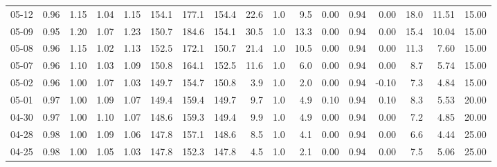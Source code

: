 \begin{threeparttable}
{\begin{tabular}{lrrrrrrrrrrrrrrrr}
  05-12 &         0.96 &           1.15 &          1.04 &          1.15 & 154.1 & 177.1 & 154.4 &       22.6 &                      1.0 &                 9.5 &       0.00 &      0.94 &           0.00 &             18.0 &           11.51 &                  15.00 \\
  05-09 &         0.95 &           1.20 &          1.07 &          1.23 & 150.7 & 184.6 & 154.1 &       30.5 &                      1.0 &                13.3 &       0.00 &      0.94 &           0.00 &             15.4 &           10.04 &                  15.00 \\
  05-08 &         0.96 &           1.15 &          1.02 &          1.13 & 152.5 & 172.1 & 150.7 &       21.4 &                      1.0 &                10.5 &       0.00 &      0.94 &           0.00 &             11.3 &            7.60 &                  15.00 \\
  05-07 &         0.96 &           1.10 &          1.03 &          1.09 & 150.8 & 164.1 & 152.5 &       11.6 &                      1.0 &                 6.0 &       0.00 &      0.94 &           0.00 &              8.7 &            5.74 &                  15.00 \\
  05-02 &         0.96 &           1.00 &          1.07 &          1.03 & 149.7 & 154.7 & 150.8 &        3.9 &                      1.0 &                 2.0 &       0.00 &      0.94 &          -0.10 &              7.3 &            4.84 &                  15.00 \\
  05-01 &         0.97 &           1.00 &          1.09 &          1.07 & 149.4 & 159.4 & 149.7 &        9.7 &                      1.0 &                 4.9 &       0.10 &      0.94 &           0.10 &              8.3 &            5.53 &                  20.00 \\
  04-30 &         0.97 &           1.00 &          1.10 &          1.07 & 148.6 & 159.3 & 149.4 &        9.9 &                      1.0 &                 4.9 &       0.00 &      0.94 &           0.00 &              7.2 &            4.85 &                  20.00 \\
  04-28 &         0.98 &           1.00 &          1.09 &          1.06 & 147.8 & 157.1 & 148.6 &        8.5 &                      1.0 &                 4.1 &       0.00 &      0.94 &           0.00 &              6.6 &            4.44 &                  25.00 \\
  04-25 &         0.98 &           1.00 &          1.05 &          1.03 & 147.8 & 152.3 & 147.8 &        4.5 &                      1.0 &                 2.1 &       0.00 &      0.94 &           0.00 &              7.5 &            5.06 &                  25.00 \\

\end{tabular}}
\end{threeparttable}
